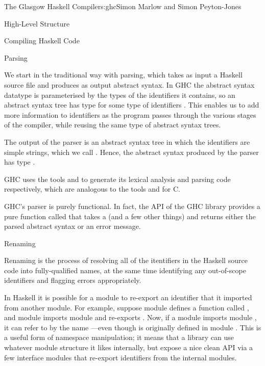 \begin{aosachapter}{The Glasgow Haskell Compiler}{s:ghc}{Simon Marlow and Simon Peyton-Jones}
\begin{aosasect1}{High-Level Structure}
\begin{aosasect2}{Compiling Haskell Code}

\begin{aosasect3}{Parsing}

We start in the traditional way with parsing, which takes as input a
Haskell source file and produces as output abstract syntax.  In GHC
the abstract syntax datatype  is parameterised by the
types of the identifiers it contains, so an abstract syntax tree has
type  for some type of identifiers .  This
enables us to add more information to identifiers as the program
passes through the various stages of the compiler, while reusing the
same type of abstract syntax trees.

The output of the parser is an abstract syntax tree in which the
identifiers are simple strings, which we call .  Hence,
the abstract syntax produced by the parser has type .

GHC uses the tools  and  to generate its
lexical analysis and parsing code respectively, which are analogous to
the tools  and  for C.

GHC's parser is purely functional.  In fact, the API of the GHC
library provides a pure function called  that takes a
 (and a few other things) and returns either the parsed
abstract syntax or an error message.

\end{aosasect3}

\begin{aosasect3}{Renaming}

Renaming is the process of resolving all of the itentifiers in the
Haskell source code into fully-qualified names, at the same time
identifying any out-of-scope identifiers and flagging errors
appropriately.

In Haskell it is possible for a module to re-export an identifier that
it imported from another module.  For example, suppose module 
defines a function called , and module  imports module
 and re-exports .  Now, if a module  imports
module , it can refer to  by the name
---even though  is originally defined in module
.  This is a useful form of namespace manipulation; it means
that a library can use whatever module structure it likes internally,
but expose a nice clean API via a few interface modules that re-export
identifiers from the internal modules.


\end{aosasect3}
\end{aosasect2}
\end{aosasect1}
\end{aosachapter}
